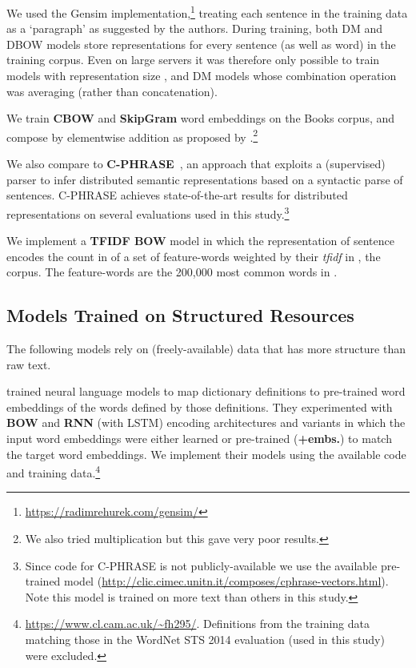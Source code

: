 \documentclass[11pt,letterpaper]{article}
\begin{document}
We used the Gensim implementation,\footnote{\scriptsize \url{https://radimrehurek.com/gensim/}} treating each sentence in the training data as a `paragraph' as suggested by the authors. During training, both DM and DBOW models store representations for every sentence (as well as word) in the training corpus. Even on large servers it was therefore only possible to train models with representation size , and DM models whose combination operation was averaging (rather than concatenation). 

\vspace{5pt} We train {\bf CBOW} and {\bf SkipGram} word embeddings \cite{mikolov2013distributed} on the Books corpus, and compose by elementwise addition as proposed by .\footnote{We also tried multiplication but this gave very poor results.} 

We also compare to {\bf C-PHRASE}~\cite{marcobaronijointly}, an approach that exploits a (supervised) parser to infer distributed semantic representations based on a syntactic parse of sentences. C-PHRASE achieves state-of-the-art results for distributed representations on several evaluations used in this study.\footnote{Since code for C-PHRASE is not publicly-available we use the available pre-trained model ({\scriptsize \url{http://clic.cimec.unitn.it/composes/cphrase-vectors.html}}). Note this model is trained on  more text than others in this study.}

\vspace{5pt} We implement a {\bf TFIDF BOW} model in which the representation of sentence  encodes the count in  of a set of feature-words weighted by their \emph{tfidf} in , the corpus. The feature-words are the 200,000 most common words in . 

\subsection{Models Trained on Structured Resources}
The following models rely on (freely-available) data that has more structure than raw text.

\vspace{5pt}  trained neural language models to map dictionary definitions to pre-trained word embeddings of the words defined by those definitions. They experimented with {\bf BOW} and {\bf RNN} (with LSTM) encoding architectures and variants in which the input word embeddings were either learned or pre-trained ({\bf+embs.}) to match the target word embeddings. We implement their models using the available code and training data.\footnote{{\scriptsize \url{https://www.cl.cam.ac.uk/~fh295/}}. Definitions from the training data matching those in the WordNet STS 2014 evaluation (used in this study) were excluded.}
\end{document}
